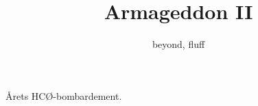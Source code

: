 \documentclass[danish]{article}
\title{Armageddon II}
\author{beyond, fluff}
\begin{document}
\maketitle

Årets HCØ-bombardement.
\end{document}

